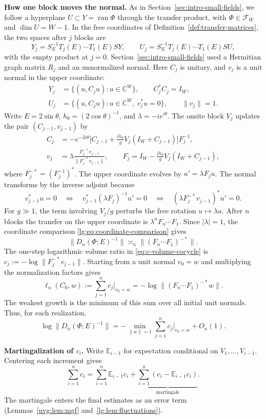 \documentclass[11pt]{article}
\numberwithin{equation}{section}
\theoremstyle{remark}
\newcommand{\E}{\mathbb E}
\newcommand{\C}{\mathbb C}
\newcommand{\ran}{\operatorname{ran}}
\begin{document}
\medskip\noindent\textbf{How one block moves the normal.}
As in Section~\ref{sec:intro-small-fields}, we follow a hyperplane
$U\subset Y=\ran\Phi$ through the transfer product, with
$\Phi\in\mathcal F_W$ and $\dim U=W-1$. In the free coordinates of
Definition~\ref{def:transfer-matrices}, the two spaces after $j$ blocks are
\[
 Y_j=S_E^{-1}T_j(E)\cdots T_1(E)S Y,\qquad
 U_j=S_E^{-1}T_j(E)\cdots T_1(E)S U,
\]
with the empty product at $j=0$. Section~\ref{sec:intro-small-fields}
used a Hermitian graph matrix $R_j$ and an unnormalized normal. Here
$C_j$ is unitary, and $v_j$ is a unit normal in the upper coordinate:
\[
 \begin{aligned}
 Y_j&=\{(u,C_ju):u\in\C^W\},\qquad C_j^*C_j=I_W,\\
 U_j&=\{(u,C_ju):u\in\C^W,\ v_j^*u=0\},\qquad \|v_j\|=1.
 \end{aligned}
\]
Write $E=2\sin\theta$, $h_\theta=(2\cos\theta)^{-1}$,
and $\lambda=-ie^{i\theta}$. The onsite block $V_j$ updates the pair
$(C_{j-1},v_{j-1})$ by
\[
 \begin{aligned}
 C_j&=-e^{-2i\theta}\bigl[C_{j-1}+\tfrac{ih_\theta}{g}V_j(I_W+C_{j-1})\bigr]F_j^{-1},\\
 v_j&=\lambda\frac{F_j^{-*}v_{j-1}}{\|F_j^{-*}v_{j-1}\|},
 \qquad F_j=I_W-\tfrac{ih_\theta}{g}V_j(I_W+C_{j-1}),
 \end{aligned}
\]
where $F_j^{-*}=(F_j^{-1})^*$. The upper coordinate evolves by
$u'=\lambda F_j u$. The normal transforms by the inverse adjoint because
\[
 v_{j-1}^*u=0
 \quad\Longleftrightarrow\quad
 v_{j-1}^*(\lambda F_j)^{-1}u'=0
 \quad\Longleftrightarrow\quad
 (\lambda F_j^{-*}v_{j-1})^*u'=0.
\]
For $g\gg1$, the term involving $V_j/g$
perturbs the free rotation $u\mapsto\lambda u$. After $n$ blocks the
transfer on the upper coordinate is $\lambda^nF_n\cdots F_1$. Since
$|\lambda|=1$, the coordinate comparison \eqref{lg:eq:coordinate-comparison}
gives
\[
 \|D_n(\Phi;E)^{-1}\|\asymp_\kappa\|(F_n\cdots F_1)^{-*}\|.
\]
The one-step logarithmic volume ratio in \eqref{eq:c-volume-cocycle}
is $c_j:=-\log\|F_j^{-*}v_{j-1}\|$. Starting from a unit normal
$v_0=w$ and multiplying the normalization factors gives
\[
 \ell_n(C_0,w):=\sum_{j=1}^n c_j\big|_{v_0=w}
 =-\log\|(F_n\cdots F_1)^{-*}w\|.
\]
The weakest growth is the minimum of this sum over all initial unit
normals. Thus, for each realization,
\[
 \log\|D_n(\Phi;E)^{-1}\|
 =-\min_{\|w\|=1}\sum_{j=1}^n c_j\big|_{v_0=w}+O_\kappa(1).
\]

\medskip\noindent\textbf{Martingalization of $c_i$.}
Write $\E_{i-1}$ for expectation conditional on
$V_1,\ldots,V_{i-1}$. Centering each increment gives
\[
 \sum_{i=1}^n c_i
 =\sum_{i=1}^n\E_{i-1}c_i
 +\underbrace{\sum_{i=1}^n(c_i-\E_{i-1}c_i)}_{\text{martingale}}.
\]
The martingale enters the final estimates as an error term
(Lemmas~\ref{uvg:lem:mgf} and~\ref{lg:lem:fluctuations}).
\end{document}
